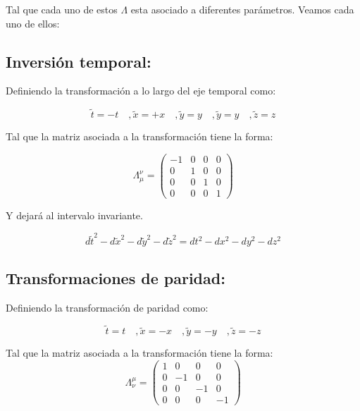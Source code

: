 \documentclass[../main.tex]{subfiles}
\begin{document}
Tal que cada uno de estos $\Lambda$ esta asociado a diferentes parámetros. Veamos cada uno de ellos: 

\subsection{Inversión temporal:}
Definiendo la transformación a lo largo del eje temporal como: 

\begin{equation*}
  \tilde{t}= -t \quad , \tilde{x}=+x \quad ,\tilde{y}= y \quad , \tilde{y}=y \quad , \tilde{z}=z 
\end{equation*}

Tal que la matriz asociada a la transformación tiene la forma: 

\begin{equation}
  \Lambda_\mu^\nu = \begin{pmatrix}
    -1 & 0 & 0 & 0 \\
    0 & 1 & 0 & 0 \\
    0 & 0 & 1 & 0 \\
    0 & 0 & 0 & 1 
  \end{pmatrix}
\end{equation}

Y dejará al intervalo invariante. 

\begin{equation*}
  d\tilde{t}^2 -d\tilde{x}^2 - d\tilde{y}^2-d\tilde{z}^2 = dt^2-dx^2-dy^2-dz^2
\end{equation*}

\subsection{Transformaciones de paridad:}

Definiendo la transformación de paridad como: 

\begin{equation*}
  \tilde{t}= t \quad , \tilde{x}= -x \quad , \tilde{y}=-y \quad , \tilde{z}=-z
\end{equation*}

Tal que la matriz asociada a la transformación tiene la forma: 
\begin{equation*}
  \Lambda_\nu^\mu = \begin{pmatrix}
    1 & 0 & 0 & 0 \\
    0 & -1 & 0 & 0 \\
    0 & 0 & -1 & 0 \\
    0 & 0 & 0 & -1
  \end{pmatrix} 
\end{equation*}
\end{document}
